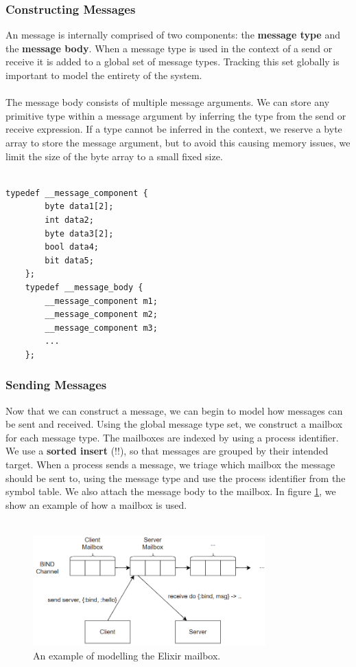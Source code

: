 \subsubsection{Constructing Messages}
An message is internally comprised of two components: the \textbf{message type} and the \textbf{message body}. When a message type is used in the context of a send or receive it is added to a global set of message types. Tracking this set globally is important to model the entirety of the system. 
\\ \\
The message body consists of multiple message arguments. We can store any primitive type within a message argument by inferring the type from the send or receive expression. If a type cannot be inferred in the context, we reserve a byte array to store the message argument, but to avoid this causing memory issues, we limit the size of the byte array to a small fixed size.
\\ \\
\begin{lstlisting}[language=Promela, caption={Example of a message body, from the Verlixir Promela library.}]
    typedef __message_component {
        byte data1[2];
        int data2;
        byte data3[2];
        bool data4;
        bit data5;
    };
    typedef __message_body {
        __message_component m1;
        __message_component m2;
        __message_component m3;
        ...
    };
\end{lstlisting}
\subsubsection{Sending Messages}
Now that we can construct a message, we can begin to model how messages can be sent and received. Using the global message type set, we construct a mailbox for each message type. The mailboxes are indexed by using a process identifier. We use a \textbf{sorted insert} (!!), so that messages are grouped by their intended target. When a process sends a message, we triage which mailbox the message should be sent to, using the message type and use the process identifier from the symbol table. We also attach the message body to the mailbox. In figure \ref{fig:promela_mailbox}, we show an example of how a mailbox is used.
\\ \\
\begin{figure}[h]
    \centering
    \includegraphics[width=0.8\textwidth]{images/promela_messages.png}
    \caption{An example of modelling the Elixir mailbox.}
    \label{fig:promela_mailbox}
\end{figure}
\\ \\

